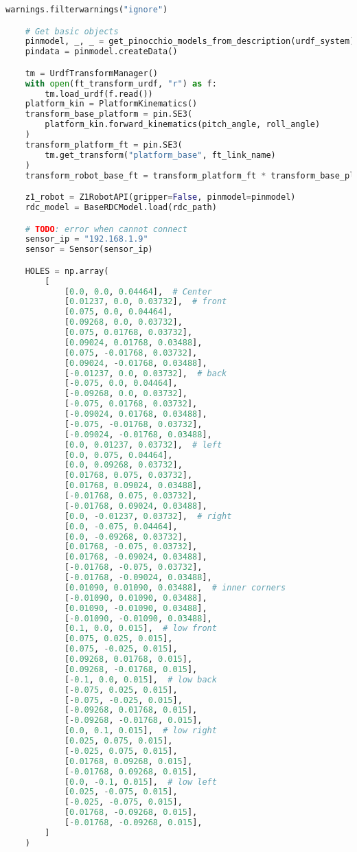 \begin{lstlisting}[language=python, caption=\raggedright{verification/fs\_verification.py}, frame=single]
    warnings.filterwarnings("ignore")

    # Get basic objects
    pinmodel, _, _ = get_pinocchio_models_from_description(urdf_system)
    pindata = pinmodel.createData()

    tm = UrdfTransformManager()
    with open(ft_transform_urdf, "r") as f:
        tm.load_urdf(f.read())
    platform_kin = PlatformKinematics()
    transform_base_platform = pin.SE3(
        platform_kin.forward_kinematics(pitch_angle, roll_angle)
    )
    transform_platform_ft = pin.SE3(
        tm.get_transform("platform_base", ft_link_name)
    )
    transform_robot_base_ft = transform_platform_ft * transform_base_platform

    z1_robot = Z1RobotAPI(gripper=False, pinmodel=pinmodel)
    rdc_model = BaseRDCModel.load(rdc_path)

    # TODO: error when cannot connect
    sensor_ip = "192.168.1.9"
    sensor = Sensor(sensor_ip)

    HOLES = np.array(
        [
            [0.0, 0.0, 0.04464],  # Center
            [0.01237, 0.0, 0.03732],  # front
            [0.075, 0.0, 0.04464],
            [0.09268, 0.0, 0.03732],
            [0.075, 0.01768, 0.03732],
            [0.09024, 0.01768, 0.03488],
            [0.075, -0.01768, 0.03732],
            [0.09024, -0.01768, 0.03488],
            [-0.01237, 0.0, 0.03732],  # back
            [-0.075, 0.0, 0.04464],
            [-0.09268, 0.0, 0.03732],
            [-0.075, 0.01768, 0.03732],
            [-0.09024, 0.01768, 0.03488],
            [-0.075, -0.01768, 0.03732],
            [-0.09024, -0.01768, 0.03488],
            [0.0, 0.01237, 0.03732],  # left
            [0.0, 0.075, 0.04464],
            [0.0, 0.09268, 0.03732],
            [0.01768, 0.075, 0.03732],
            [0.01768, 0.09024, 0.03488],
            [-0.01768, 0.075, 0.03732],
            [-0.01768, 0.09024, 0.03488],
            [0.0, -0.01237, 0.03732],  # right
            [0.0, -0.075, 0.04464],
            [0.0, -0.09268, 0.03732],
            [0.01768, -0.075, 0.03732],
            [0.01768, -0.09024, 0.03488],
            [-0.01768, -0.075, 0.03732],
            [-0.01768, -0.09024, 0.03488],
            [0.01090, 0.01090, 0.03488],  # inner corners
            [-0.01090, 0.01090, 0.03488],
            [0.01090, -0.01090, 0.03488],
            [-0.01090, -0.01090, 0.03488],
            [0.1, 0.0, 0.015],  # low front
            [0.075, 0.025, 0.015],
            [0.075, -0.025, 0.015],
            [0.09268, 0.01768, 0.015],
            [0.09268, -0.01768, 0.015],
            [-0.1, 0.0, 0.015],  # low back
            [-0.075, 0.025, 0.015],
            [-0.075, -0.025, 0.015],
            [-0.09268, 0.01768, 0.015],
            [-0.09268, -0.01768, 0.015],
            [0.0, 0.1, 0.015],  # low right
            [0.025, 0.075, 0.015],
            [-0.025, 0.075, 0.015],
            [0.01768, 0.09268, 0.015],
            [-0.01768, 0.09268, 0.015],
            [0.0, -0.1, 0.015],  # low left
            [0.025, -0.075, 0.015],
            [-0.025, -0.075, 0.015],
            [0.01768, -0.09268, 0.015],
            [-0.01768, -0.09268, 0.015],
        ]
    )


\end{lstlisting}
